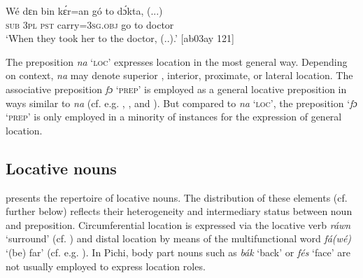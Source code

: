 \ea%
    \label{ex:key:909}
    \gll Wé  dɛn  bin  kɛ́r=an    gó  to  dɔ́kta,  (...)\\
\textsc{sub}  \textsc{3pl}  \textsc{pst}  carry=\textsc{3sg.obj}  go  to  doctor\\

\glt ‘When they took her to the doctor, (..).’ [ab03ay 121]
\z

The preposition \textit{na} ‘\textsc{loc}’ expresses location in the most general way. Depending on context, \textit{na} may denote superior , interior, proximate, or lateral  location. The associative preposition \textit{fɔ} ‘\textsc{prep}’ is employed as a general locative preposition in ways similar to \textit{na} (cf. e.g. , ,  and ). But compared to \textit{na} ‘\textsc{loc}’, the preposition ‘\textit{fɔ} ‘\textsc{prep}’ is only employed in a minority of instances for the expression of general location.

\subsection{Locative nouns}\label{sec:8.1.2}
 presents the repertoire of locative nouns. The distribution of these elements (cf.  further below) reflects their heterogeneity and intermediary status between noun and preposition. Circumferential location is expressed via the locative verb \textit{ráwn} ‘surround’ (cf. ) and distal location by means of the multifunctional word \textit{fá(wé)} ‘(be) far’ (cf. e.g. ). In Pichi, body part nouns such as \textit{bák} ‘back’ or \textit{fés} ‘face’ are not usually employed to express location roles.

